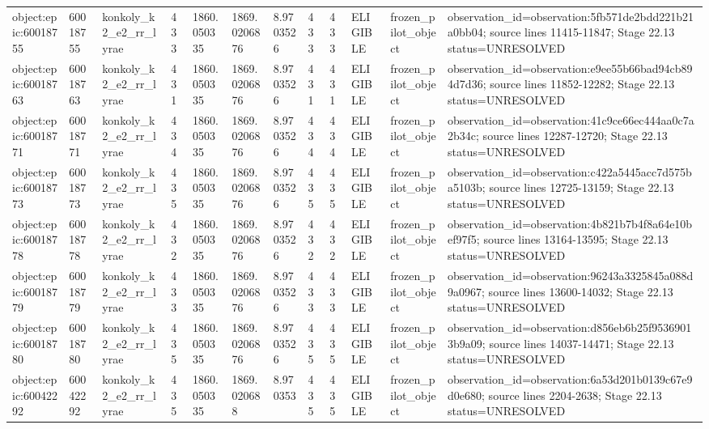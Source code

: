 \begin{longtable}{llllllllllll}
object:epic:60018755 & 60018755 & konkoly\_k2\_e2\_rr\_lyrae & 433 & 1860.050335 & 1869.0206876 & 8.9703526 & 433 & 433 & ELIGIBLE & frozen\_pilot\_object & observation\_id=observation:5fb571de2bdd221b21a0bb04; source lines 11415-11847; Stage 22.13 status=UNRESOLVED \\
object:epic:60018763 & 60018763 & konkoly\_k2\_e2\_rr\_lyrae & 431 & 1860.050335 & 1869.0206876 & 8.9703526 & 431 & 431 & ELIGIBLE & frozen\_pilot\_object & observation\_id=observation:e9ee55b66bad94cb894d7d36; source lines 11852-12282; Stage 22.13 status=UNRESOLVED \\
object:epic:60018771 & 60018771 & konkoly\_k2\_e2\_rr\_lyrae & 434 & 1860.050335 & 1869.0206876 & 8.9703526 & 434 & 434 & ELIGIBLE & frozen\_pilot\_object & observation\_id=observation:41c9ce66ec444aa0c7a2b34c; source lines 12287-12720; Stage 22.13 status=UNRESOLVED \\
object:epic:60018773 & 60018773 & konkoly\_k2\_e2\_rr\_lyrae & 435 & 1860.050335 & 1869.0206876 & 8.9703526 & 435 & 435 & ELIGIBLE & frozen\_pilot\_object & observation\_id=observation:c422a5445acc7d575ba5103b; source lines 12725-13159; Stage 22.13 status=UNRESOLVED \\
object:epic:60018778 & 60018778 & konkoly\_k2\_e2\_rr\_lyrae & 432 & 1860.050335 & 1869.0206876 & 8.9703526 & 432 & 432 & ELIGIBLE & frozen\_pilot\_object & observation\_id=observation:4b821b7b4f8a64e10bef97f5; source lines 13164-13595; Stage 22.13 status=UNRESOLVED \\
object:epic:60018779 & 60018779 & konkoly\_k2\_e2\_rr\_lyrae & 433 & 1860.050335 & 1869.0206876 & 8.9703526 & 433 & 433 & ELIGIBLE & frozen\_pilot\_object & observation\_id=observation:96243a3325845a088d9a0967; source lines 13600-14032; Stage 22.13 status=UNRESOLVED \\
object:epic:60018780 & 60018780 & konkoly\_k2\_e2\_rr\_lyrae & 435 & 1860.050335 & 1869.0206876 & 8.9703526 & 435 & 435 & ELIGIBLE & frozen\_pilot\_object & observation\_id=observation:d856eb6b25f95369013b9a09; source lines 14037-14471; Stage 22.13 status=UNRESOLVED \\
object:epic:60042292 & 60042292 & konkoly\_k2\_e2\_rr\_lyrae & 435 & 1860.050335 & 1869.020688 & 8.970353 & 435 & 435 & ELIGIBLE & frozen\_pilot\_object & observation\_id=observation:6a53d201b0139c67e9d0e680; source lines 2204-2638; Stage 22.13 status=UNRESOLVED \\
\bottomrule
\end{longtable}
